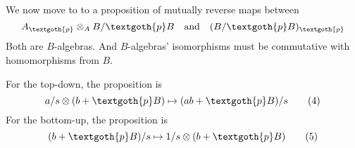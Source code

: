 \documentclass{article}
\begin{document}
We now move to to a proposition of mutually reverse maps between 
\[
A_\textgoth{p} \otimes_A B/\textgoth{p}B \quad  \text{and} \quad
(B/\textgoth{p}B)_\textgoth{p}
\]
Both are $B$-algebras. And $B$-algebras' isomorphisms must be commutative with homomorphisms from $B$.

\begin{figure}[htb]
\centering
\begin{subfigure}[T]{0.4\textwidth}
\centering
{}
\end{subfigure}
\centering
\begin{subfigure}[T]{0.4\textwidth}
\centering
{}
\end{subfigure}
\end{figure}
\noindent
For the top-down, the proposition is
\[
a/s \otimes (b + \textgoth{p}B) \mapsto (ab + \textgoth{p}B)/s
\tag{4}\label{eq:fourth}
\]
For the bottom-up, the proposition is
\[
(b + \textgoth{p}B)/s \mapsto  1/s \otimes (b + \textgoth{p}B)
\tag{5}\label{eq:fifth}
\]
\end{document}
